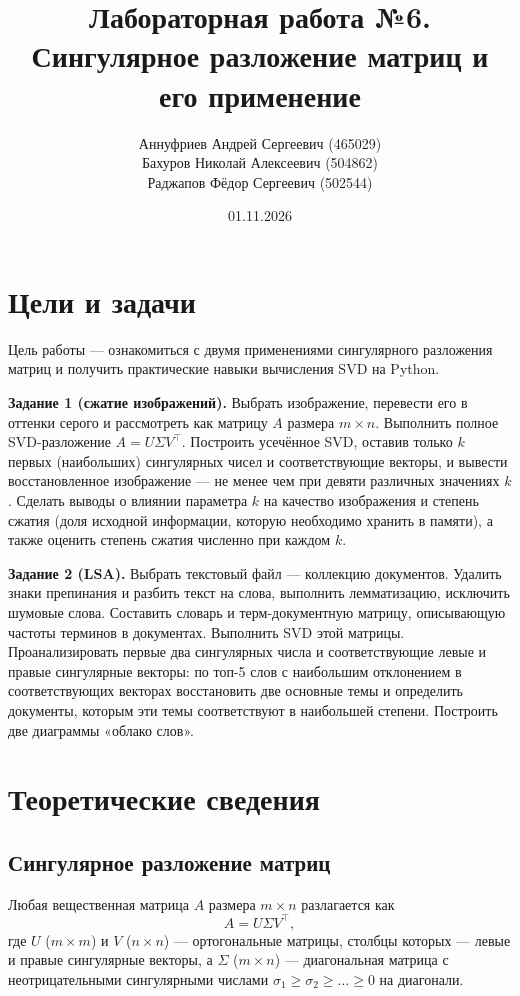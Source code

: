 \documentclass[12pt,a4paper]{article}
\title{Лабораторная работа №6. Сингулярное разложение матриц и его применение}
\author{%
    Аннуфриев Андрей Сергеевич (465029)\\
    Бахуров Николай Алексеевич (504862)\\
    Раджапов Фёдор Сергеевич (502544)%
}
\date{01.11.2026}
\begin{document}
\sloppy
\maketitle
\tableofcontents
\newpage

\section{Цели и задачи}
Цель работы — ознакомиться с двумя применениями сингулярного разложения матриц и получить
практические навыки вычисления SVD на Python.

\textbf{Задание 1 (сжатие изображений).} Выбрать изображение, перевести его в оттенки
серого и рассмотреть как матрицу $A$ размера $m\times n$. Выполнить полное SVD-разложение
$A = U\Sigma V^\top$. Построить усечённое SVD, оставив только $k$ первых (наибольших)
сингулярных чисел и соответствующие векторы, и вывести восстановленное изображение — не
менее чем при девяти различных значениях $k$. Сделать выводы о влиянии параметра $k$ на
качество изображения и степень сжатия (доля исходной информации, которую необходимо
хранить в памяти), а также оценить степень сжатия численно при каждом $k$.

\textbf{Задание 2 (LSA).} Выбрать текстовый файл — коллекцию документов. Удалить знаки
препинания и разбить текст на слова, выполнить лемматизацию, исключить шумовые слова.
Составить словарь и терм-документную матрицу, описывающую частоты терминов в документах.
Выполнить SVD этой матрицы. Проанализировать первые два сингулярных числа и соответствующие
левые и правые сингулярные векторы: по топ-5 слов с наибольшим отклонением в соответствующих
векторах восстановить две основные темы и определить документы, которым эти темы
соответствуют в наибольшей степени. Построить две диаграммы «облако слов».

\section{Теоретические сведения}

\subsection{Сингулярное разложение матриц}
Любая вещественная матрица $A$ размера $m\times n$ разлагается как
\[
    A = U\Sigma V^\top,
\]
где $U$ ($m\times m$) и $V$ ($n\times n$) — ортогональные матрицы, столбцы которых —
левые и правые сингулярные векторы, а $\Sigma$ ($m\times n$) — диагональная матрица с
неотрицательными сингулярными числами $\sigma_1\ge\sigma_2\ge\dots\ge0$ на диагонали.
\end{document}
